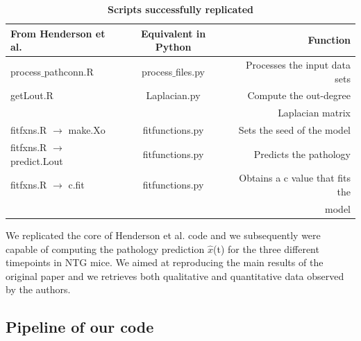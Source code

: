 \begin{table}[ht]
  \begin{center}
    \caption{\textbf{Scripts successfully replicated}}
    \label{tab:table1}
    \begin{tabular}{|l|c|r|} %
      \hline
      \textbf{From Henderson et al.} & \textbf{Equivalent in Python} & \textbf{Function}\\

      \hline
      process$\_$pathconn.R & process$\_$files.py & Processes the input data sets\\
      getLout.R & Laplacian.py & Compute the out-degree\\
       &  & Laplacian matrix\\
      fitfxns.R $\rightarrow$ make.Xo & fitfunctions.py & Sets the seed of the model\\
      
      fitfxns.R $\rightarrow$ predict.Lout & fitfunctions.py & Predicts the pathology\\ 
      fitfxns.R $\rightarrow$ c.fit & fitfunctions.py & Obtains a c value that fits the\\
      & & model\\ 
      \hline

      
    \end{tabular}
  \end{center}
\end{table}
We replicated the core of Henderson et al. code and we subsequently were capable of computing the pathology prediction $\widehat{x}$(t) for the three different timepoints in NTG mice. We aimed at reproducing the main results of the original paper and we retrieves both qualitative and quantitative data observed by the authors.\\

\subsection{Pipeline of our code}

